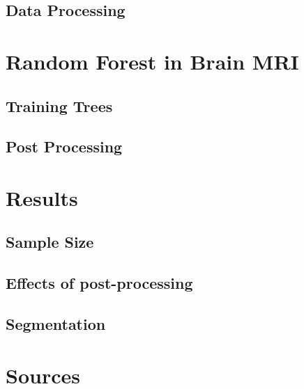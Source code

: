 \documentclass{article}
\begin{document}
 \subsection{Data Processing}

 \section{Random Forest in Brain MRI}
 \subsection{Training Trees}
 \subsection{Post Processing}

 \section{Results}
 \subsection{Sample Size}
 \subsection{Effects of post-processing}
 \subsection{Segmentation}



 \section{Sources}

 
\end{document}
